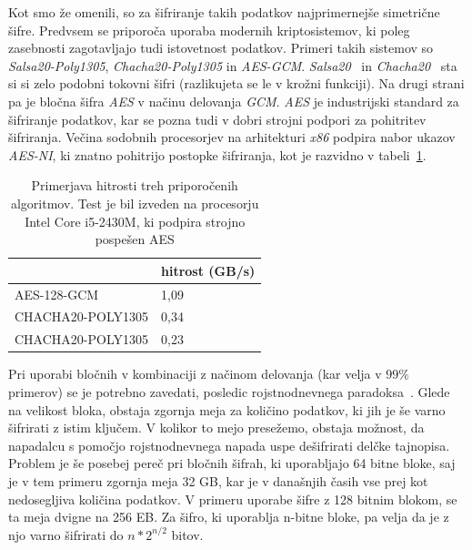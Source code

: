 \documentclass[12pt,a4paper,openany,tikz]{book}
\theoremstyle{plain}
\theoremstyle{definition}
\begin{document}
Kot smo že omenili, so za šifriranje takih podatkov najprimernejše simetrične šifre. Predvsem se priporoča uporaba modernih kriptosistemov, ki poleg zasebnosti zagotavljajo tudi istovetnost podatkov. Primeri takih sistemov so \textit{Salsa20-Poly1305}, \textit{Chacha20-Poly1305} in \textit{AES-GCM}. \textit{Salsa20}~\cite{bernstein2008salsa20} in \textit{Chacha20}~\cite{bernstein2008chacha} sta si si zelo podobni tokovni šifri (razlikujeta se le v krožni funkciji). Na drugi strani pa je bločna šifra \textit{AES} v načinu delovanja \textit{GCM}. \textit{AES} je industrijski standard za šifriranje podatkov, kar se pozna tudi v dobri strojni podpori za pohitritev šifriranja. Večina sodobnih procesorjev na arhitekturi \textit{x86} podpira nabor ukazov \textit{AES-NI}, ki znatno pohitrijo postopke šifriranja, kot je razvidno v tabeli~\ref{symmspeed}.

\begin{table}[]
\centering
\begin{tabular}{|l|l|}
\hline
                  & hitrost (GB/s) \\ \hline
AES-128-GCM       & 1,09           \\ \hline
CHACHA20-POLY1305 & 0,34           \\ \hline
CHACHA20-POLY1305 & 0,23           \\ \hline
\end{tabular}
\caption{Primerjava hitrosti treh priporočenih algoritmov. Test je bil izveden na procesorju Intel Core i5-2430M, ki podpira strojno pospešen AES}
\label{symmspeed}
\end{table}

Pri uporabi bločnih v kombinaciji z načinom delovanja (kar velja v $99\%$ primerov) se je potrebno zavedati, posledic rojstnodnevnega paradoksa~\cite{wiki:bdayparadox}. Glede na velikost bloka, obstaja zgornja meja za količino podatkov, ki jih je še varno šifrirati z istim ključem. V kolikor to mejo presežemo, obstaja možnost, da napadalcu s pomočjo rojstnodnevnega napada uspe dešifrirati delčke tajnopisa. Problem je še posebej pereč pri bločnih šifrah, ki uporabljajo 64 bitne bloke, saj je v tem primeru zgornja meja 32 GB, kar je v današnjih časih vse prej kot nedosegljiva količina podatkov. V primeru uporabe šifre z 128 bitnim blokom, se ta meja dvigne na 256 EB. Za šifro, ki uporablja n-bitne bloke, pa velja da je z njo varno šifrirati do $n*2^{n/2}$ bitov.
\end{document}
